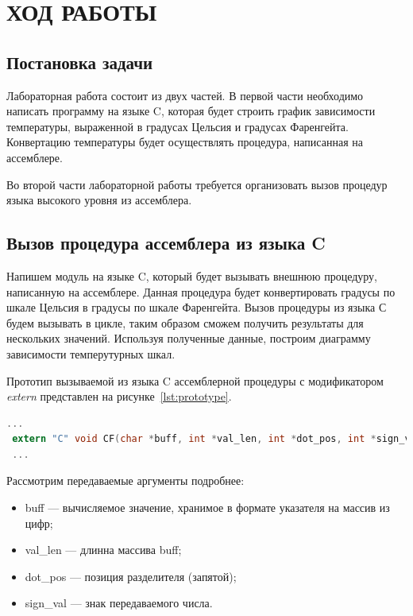 \section{ХОД РАБОТЫ}

\subsection{Постановка задачи}

Лабораторная работа состоит из двух частей. В первой части необходимо написать
программу на языке C, которая будет строить график зависимости температуры,
выраженной в градусах Цельсия и градусах Фаренгейта. Конвертацию температуры
будет осуществлять процедура, написанная на ассемблере.

Во второй части лабораторной работы требуется организовать вызов процедур
языка высокого уровня из ассемблера.

\subsection{Вызов процедура ассемблера из языка C}

Напишем модуль на языке C, который будет вызывать внешнюю процедуру, написанную
на ассемблере. Данная процедура будет конвертировать градусы по шкале Цельсия в
градусы по шкале Фаренгейта. Вызов процедуры из языка С будем вызывать в цикле,
таким образом сможем получить результаты для нескольких значений. Используя
полученные данные, построим диаграмму зависимости темперутурных шкал.

Прототип вызываемой из языка C ассемблерной процедуры с модификатором
\textit{extern} представлен на рисунке~\ref{lst:prototype}.
\begin{lstlisting}[caption=Прототип функции CF,
label=lst:prototype,language={C},basicstyle=\scriptsize\ttfamily]
 ...
 extern "C" void CF(char *buff, int *val_len, int *dot_pos, int *sign_val);
 ...
\end{lstlisting}

Рассмотрим передаваемые аргументы подробнее:

\begin{itemize}

  \item buff --- вычисляемое значение, хранимое в формате указателя на массив из цифр;
  \item val\_len --- длинна массива buff;
  \item dot\_pos --- позиция разделителя (запятой);
  \item sign\_val --- знак передаваемого числа.

\end{itemize}

